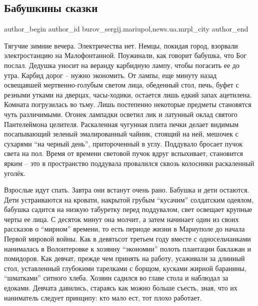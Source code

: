  
 
 
 
 
 
\subsection{Бабушкины сказки}
\label{sec:12_01_2018.stz.news.ua.mrpl_city.1.babushkiny_skazki}
 
\ifcmt
 author_begin
   author_id burov_sergij.mariupol,news.ua.mrpl_city
 author_end
\fi

Тягучие зимние вечера. Электричества нет. Немцы, покидая город, взорвали
электростанцию на Малофонтанной. Поужинали, как говорит бабушка,  что Бог
послал. Дедушка уносит на веранду карбидную лампу, чтобы погасить ее до утра.
Карбид дорог – нужно экономить. От лампы, еще минуту назад освещавшей
мертвенно-голубым светом лица, обеденный стол, печь, буфет с резными утками на
дверцах, часы-ходики, остается лишь едкий запах ацетилена. Комната погрузилась
во тьму. Лишь постепенно некоторые предметы становятся чуть различимыми. Огонек
лампадки осветил лик и латунный оклад святого Пантелеймона целителя.
Раскаленная чугунная плита печки делает видимым посапывающий зеленый
эмалированный чайник, стоящий на ней, мешочек с сухарями \enquote{на черный день},
притороченный в углу. Поддувало бросает пучок света на пол.  Время от времени
световой пучок вдруг вспыхивает, становится ярким – это в пространство
поддувала провалился сквозь колосники раскаленный уголёк.

Взрослые идут спать. Завтра они встанут очень рано. Бабушка и дети остаются.
Дети устраиваются на кровати, накрытой грубым \enquote{кусачим} солдатским одеялом,
бабушка садится на низкую табуретку перед поддувалом, свет освещает крупные
черты ее лица. С десяток минут она молчит, а затем начинает один из своих
рассказов о \enquote{мирном} времени, то есть периоде жизни в Мариуполе до начала
Первой мировой войны. Как в девятьсот третьем году вместе с односельчанками
нанималась в Волонтеровке к хозяину \enquote{экономии} полоть плантации баклажан и
помидоров. Как девчат, прежде чем принять на работу, усаживали за длинный стол,
уставленный глубокими тарелками с борщом, кусками жирной баранины, \enquote{шматками}
ситного хлеба. Хозяин садился во главе стола и наблюдал за едоками. Девчата
давились, стараясь как можно больше съесть, зная, что их наниматель следует
принципу: кто мало ест, тот плохо работает.

